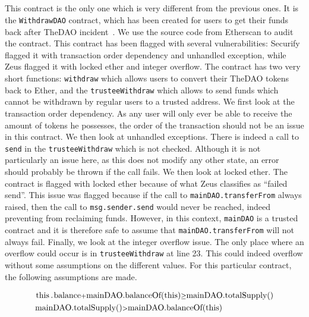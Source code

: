 \subsection*{}
This contract is the only one which is very different from the previous ones. It is the \lstinline{WithdrawDAO} contract, which has been created for users to get their funds back after TheDAO incident~\cite{Securities2017}. We use the source code from Etherscan to audit the contract.
This contract has been flagged with several vulnerabilities: Securify flagged it with transaction order dependency and unhandled exception, while Zeus flagged it with locked ether and integer overflow.
The contract has two very short functions: \lstinline{withdraw} which allows users to convert their TheDAO tokens back to Ether, and the \lstinline{trusteeWithdraw} which allows to send funds which cannot be withdrawn by regular users to a trusted address.
We first look at the transaction order dependency. As any user will only ever be able to receive the amount of tokens he possesses, the order of the transaction should not be an issue in this contract. We then look at unhandled exceptions. There is indeed a call to \lstinline{send} in the \lstinline{trusteeWithdraw} which is not checked. Although it is not particularly an issue here, as this does not modify any other state, an error should probably be thrown if the call fails. We then look at locked ether. The contract is flagged with locked ether because of what Zeus classifies as ``failed send''. This issue was flagged because if the call to \lstinline{mainDAO.transferFrom} always raised, then the call to \lstinline{msg.sender.send} would never be reached, indeed preventing from reclaiming funds. However, in this context, \lstinline{mainDAO} is a trusted contract and it is therefore safe to assume that \lstinline{mainDAO.transferFrom} will not always fail. Finally, we look at the integer overflow issue. The only place where an overflow could occur is in \lstinline{trusteeWithdraw} at line 23. This could indeed overflow without some assumptions on the different values. For this particular contract, the following assumptions are made.

\lstset{
  basicstyle=\ttfamily\footnotesize,
  mathescape
}
\begin{align*}
  &\text{\lstinline{this.balance}} \mbox{\footnotesize $+$} \text{\lstinline{mainDAO.balanceOf(this)}} \mbox{\footnotesize $\geq$} \text{\lstinline{mainDAO.totalSupply()}}\\
  &\text{\lstinline{mainDAO.totalSupply()}} \mbox{\footnotesize $>$} \text{\lstinline{mainDAO.balanceOf(this)}}
\end{align*}


